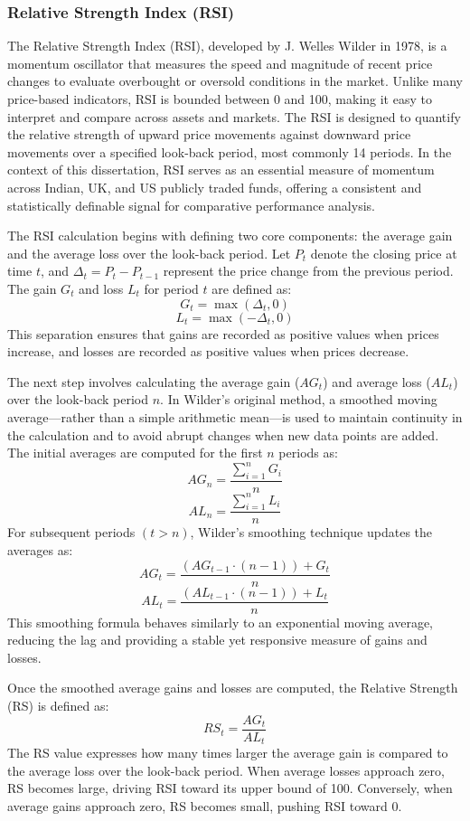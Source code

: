 \subsubsection{Relative Strength Index (RSI)}
The Relative Strength Index (RSI), developed by J. Welles Wilder in 1978, is a momentum oscillator that measures the speed and magnitude of recent price changes to evaluate overbought or oversold conditions in the market. Unlike many price-based indicators, RSI is bounded between 0 and 100, making it easy to interpret and compare across assets and markets. The RSI is designed to quantify the relative strength of upward price movements against downward price movements over a specified look-back period, most commonly 14 periods. In the context of this dissertation, RSI serves as an essential measure of momentum across Indian, UK, and US publicly traded funds, offering a consistent and statistically definable signal for comparative performance analysis.

The RSI calculation begins with defining two core components: the average gain and the average loss over the look-back period. Let $P_t$ denote the closing price at time $t$, and $\Delta_t = P_t - P_{t-1}$ represent the price change from the previous period. The gain $G_t$ and loss $L_t$ for period $t$ are defined as:
\[
G_t = \max(\Delta_t, 0)
\]
\[
L_t = \max(-\Delta_t, 0)
\]
This separation ensures that gains are recorded as positive values when prices increase, and losses are recorded as positive values when prices decrease.

The next step involves calculating the average gain ($AG_t$) and average loss ($AL_t$) over the look-back period $n$. In Wilder's original method, a smoothed moving average—rather than a simple arithmetic mean—is used to maintain continuity in the calculation and to avoid abrupt changes when new data points are added. The initial averages are computed for the first $n$ periods as:
\[
AG_n = \frac{\sum_{i=1}^{n} G_i}{n}
\]
\[
AL_n = \frac{\sum_{i=1}^{n} L_i}{n}
\]
For subsequent periods $(t > n)$, Wilder's smoothing technique updates the averages as:
\[
AG_t = \frac{(AG_{t-1} \cdot (n-1)) + G_t}{n}
\]
\[
AL_t = \frac{(AL_{t-1} \cdot (n-1)) + L_t}{n}
\]
This smoothing formula behaves similarly to an exponential moving average, reducing the lag and providing a stable yet responsive measure of gains and losses.

Once the smoothed average gains and losses are computed, the Relative Strength (RS) is defined as:
\[
RS_t = \frac{AG_t}{AL_t}
\]
The RS value expresses how many times larger the average gain is compared to the average loss over the look-back period. When average losses approach zero, RS becomes large, driving RSI toward its upper bound of 100. Conversely, when average gains approach zero, RS becomes small, pushing RSI toward 0.

